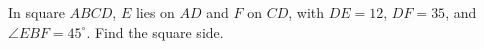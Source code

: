 In square $ABCD$, $E$ lies on $AD$ and $F$ on $CD$, with $DE=12$, $DF=35$, and $\angle EBF=45^\circ$. Find the square side.
